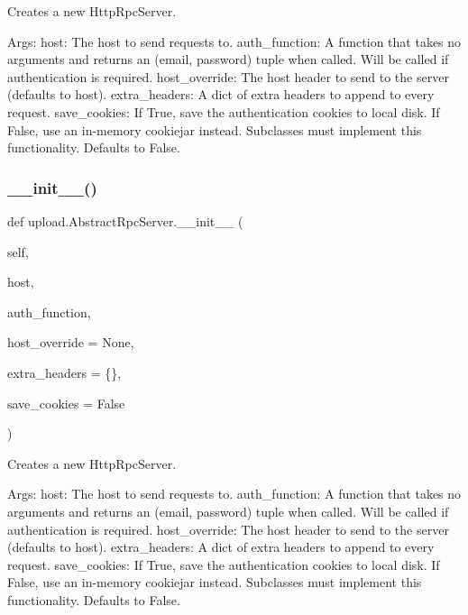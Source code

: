 \begin{DoxyVerb}Creates a new HttpRpcServer.

Args:
  host: The host to send requests to.
  auth_function: A function that takes no arguments and returns an
(email, password) tuple when called. Will be called if authentication
is required.
  host_override: The host header to send to the server (defaults to host).
  extra_headers: A dict of extra headers to append to every request.
  save_cookies: If True, save the authentication cookies to local disk.
If False, use an in-memory cookiejar instead.  Subclasses must
implement this functionality.  Defaults to False.
\end{DoxyVerb}
 \mbox{\label{classupload_1_1AbstractRpcServer_a3f6bc1bd16b52bd5a5c33a1fedeef2d0}} 
\subsubsection{\texorpdfstring{\_\_init\_\_()}{\_\_init\_\_()}\hspace{0.1cm}{\footnotesize\ttfamily [2/2]}}
{\footnotesize\ttfamily def upload.\+Abstract\+Rpc\+Server.\+\_\+\+\_\+init\+\_\+\+\_\+ (\begin{DoxyParamCaption}\item[{}]{self,  }\item[{}]{host,  }\item[{}]{auth\+\_\+function,  }\item[{}]{host\+\_\+override = {\ttfamily None},  }\item[{}]{extra\+\_\+headers = {\ttfamily \{\}},  }\item[{}]{save\+\_\+cookies = {\ttfamily False} }\end{DoxyParamCaption})}

\begin{DoxyVerb}Creates a new HttpRpcServer.

Args:
  host: The host to send requests to.
  auth_function: A function that takes no arguments and returns an
(email, password) tuple when called. Will be called if authentication
is required.
  host_override: The host header to send to the server (defaults to host).
  extra_headers: A dict of extra headers to append to every request.
  save_cookies: If True, save the authentication cookies to local disk.
If False, use an in-memory cookiejar instead.  Subclasses must
implement this functionality.  Defaults to False.
\end{DoxyVerb}
 

